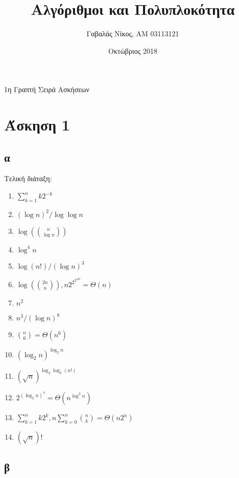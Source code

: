 \documentclass[12pt,a4paper]{article}
\title{Αλγόριθμοι και Πολυπλοκότητα}
\author{Γαβαλάς Νίκος, AM 03113121}
\date{Οκτώβριος 2018}
\begin{document}
  \maketitle

  \begin{center}
    \Large{1η Γραπτή Σειρά Ασκήσεων}
  \end{center}

  \section{Άσκηση 1}

  \subsection{α}

    Τελική διάταξη:

    \begin{enumerate}
      \item \( \sum_{k=1}^{n}k2^{-k}  \)
      \item \( (\log{n})^2/\log\log{n}  \)
      \item \( \log(\binom{n}{\log{n}})  \)
      \item \( \log^{4}n \)
      \item \( \log(n!)/(\log{n})^3 \)
      \item \( \log(\binom{2n}{n}), n2^{2^{2^{100}}}=\Theta(n) \)
      \item \( n^2 \)
      \item \( n^3/(\log{n})^8 \)
      \item \( \binom{n}{6}=\Theta(n^6) \)
      \item \( (\log_{2}{n})^{\log_{2}{n}} \)
      \item \( (\sqrt{n})^{\log_{2}\log_{2}(n!)} \)
      \item \( 2^{(\log_{2}{n})^4}=\Theta(n^{\log^3{n}}) \)
      \item \( \sum_{k=1}^{n}k2^k, n\sum_{k=0}^{n}\binom{n}{k}=\Theta(n2^n) \)
      \item \( (\sqrt{n})! \)
    \end{enumerate}

  \subsection{β}
\end{document}
